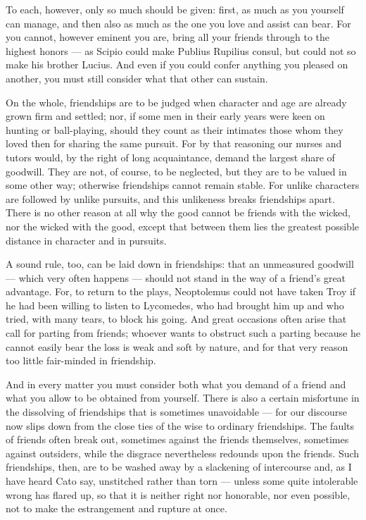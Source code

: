  To each, however, only so much should be given: first, as much as you yourself can manage, and then also as much as the one you love and assist can bear. For you cannot, however eminent you are, bring all your friends through to the highest honors — as Scipio could make Publius Rupilius consul, but could not so make his brother Lucius. And even if you could confer anything you pleased on another, you must still consider what that other can sustain.

 On the whole, friendships are to be judged when character and age are already grown firm and settled; nor, if some men in their early years were keen on hunting or ball-playing, should they count as their intimates those whom they loved then for sharing the same pursuit. For by that reasoning our nurses and tutors would, by the right of long acquaintance, demand the largest share of goodwill. They are not, of course, to be neglected, but they are to be valued in some other way; otherwise friendships cannot remain stable. For unlike characters are followed by unlike pursuits, and this unlikeness breaks friendships apart. There is no other reason at all why the good cannot be friends with the wicked, nor the wicked with the good, except that between them lies the greatest possible distance in character and in pursuits.

 A sound rule, too, can be laid down in friendships: that an unmeasured goodwill — which very often happens — should not stand in the way of a friend's great advantage. For, to return to the plays, Neoptolemus could not have taken Troy if he had been willing to listen to Lycomedes, who had brought him up and who tried, with many tears, to block his going. And great occasions often arise that call for parting from friends; whoever wants to obstruct such a parting because he cannot easily bear the loss is weak and soft by nature, and for that very reason too little fair-minded in friendship.

 And in every matter you must consider both what you demand of a friend and what you allow to be obtained from yourself. There is also a certain misfortune in the dissolving of friendships that is sometimes unavoidable — for our discourse now slips down from the close ties of the wise to ordinary friendships. The faults of friends often break out, sometimes against the friends themselves, sometimes against outsiders, while the disgrace nevertheless redounds upon the friends. Such friendships, then, are to be washed away by a slackening of intercourse and, as I have heard Cato say, unstitched rather than torn — unless some quite intolerable wrong has flared up, so that it is neither right nor honorable, nor even possible, not to make the estrangement and rupture at once.

